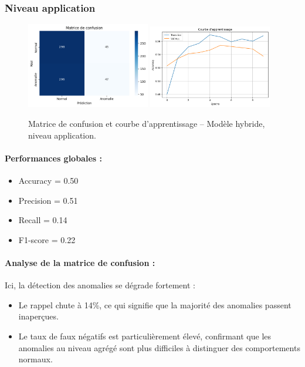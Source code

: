 \documentclass[a4paper,12pt]{report}
\begin{document}
\subsubsection*{Niveau application}

\begin{figure}[H]
    \centering
    \includegraphics[width=0.48\textwidth]{images/confusion_matrix_hybrid_application.png}
    \includegraphics[width=0.48\textwidth]{images/loss_curve_hybrid_application.png}
    \caption{Matrice de confusion et courbe d’apprentissage – Modèle hybride, niveau application.}
\end{figure}

\paragraph{Performances globales :}
\begin{itemize}
    \item Accuracy = 0.50
    \item Precision = 0.51
    \item Recall = 0.14
    \item F1-score = 0.22
\end{itemize}

\paragraph{Analyse de la matrice de confusion :}
Ici, la détection des anomalies se dégrade fortement :
\begin{itemize}
    \item Le rappel chute à 14\%, ce qui signifie que la majorité des anomalies passent inaperçues.
    \item Le taux de faux négatifs est particulièrement élevé, confirmant que les anomalies au niveau agrégé sont plus difficiles à distinguer des comportements normaux.
\end{itemize}
\end{document}
